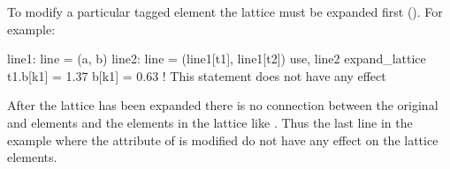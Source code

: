 To modify a particular tagged element the lattice must be expanded
first (). For example:
\begin{example}
  line1: line = (a, b)
  line2: line = (line1[t1], line1[t2])
  use, line2
  expand_lattice
  t1.b[k1] = 1.37
  b[k1] = 0.63       ! This statement does not have any effect
\end{example}
After the lattice has been expanded there is no connection between 
the original  and  elements and the elements in the lattice like
. Thus the last line in the example where the  attribute of 
is modified do not have any effect on the lattice elements. 

